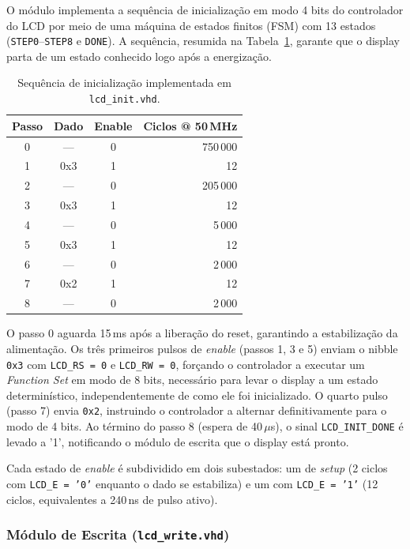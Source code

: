 \documentclass[12pt,a4paper]{article}
\begin{document}
O módulo implementa a sequência de inicialização em modo 4 bits do controlador do LCD
por meio de uma máquina de estados finitos (FSM) com 13 estados
(\texttt{STEP0}–\texttt{STEP8} e \texttt{DONE}). A sequência, resumida na
Tabela~\ref{tab:init_seq}, garante que o display parta de um estado conhecido logo após
a energização.

\begin{table}[H]
\centering
\begin{tabular}{cccr}
\hline
\textbf{Passo} & \textbf{Dado} & \textbf{Enable} & \textbf{Ciclos @ 50\,MHz} \\
\hline
0 & ---  & 0 & 750\,000 \\
1 & 0x3  & 1 & 12 \\
2 & ---  & 0 & 205\,000 \\
3 & 0x3  & 1 & 12 \\
4 & ---  & 0 & 5\,000 \\
5 & 0x3  & 1 & 12 \\
6 & ---  & 0 & 2\,000 \\
7 & 0x2  & 1 & 12 \\
8 & ---  & 0 & 2\,000 \\
\hline
\end{tabular}
\caption{Sequência de inicialização implementada em \texttt{lcd\_init.vhd}.}
\label{tab:init_seq}
\end{table}

O passo 0 aguarda 15\,ms após a liberação do reset, garantindo a estabilização da
alimentação. Os três primeiros pulsos de \textit{enable} (passos 1, 3 e 5) enviam o
nibble \texttt{0x3} com \texttt{LCD\_RS = 0} e \texttt{LCD\_RW = 0}, forçando o
controlador a executar um \textit{Function Set} em modo de 8 bits, necessário para
levar o display a um estado determinístico, independentemente de como ele foi
inicializado. O quarto pulso (passo 7) envia \texttt{0x2}, instruindo o controlador a
alternar definitivamente para o modo de 4 bits. Ao término do passo 8 (espera de
40\,$\mu$s), o sinal \texttt{LCD\_INIT\_DONE} é levado a '1', notificando o módulo de
escrita que o display está pronto.

Cada estado de \textit{enable} é subdividido em dois subestados: um de \textit{setup}
(2 ciclos com \texttt{LCD\_E = '0'} enquanto o dado se estabiliza) e um com
\texttt{LCD\_E = '1'} (12 ciclos, equivalentes a 240\,ns de pulso ativo).

\subsubsection{Módulo de Escrita (\texttt{lcd\_write.vhd})}
\end{document}

